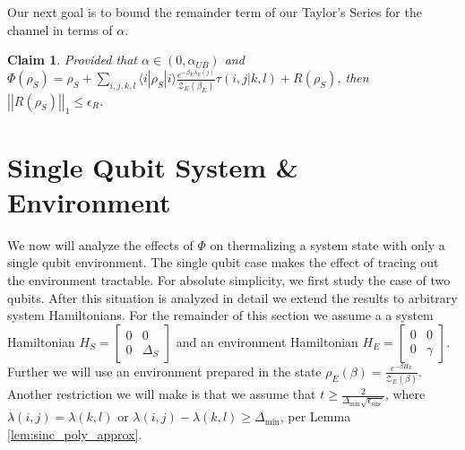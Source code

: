 \documentclass{article}
\newtheorem{claim}[theorem]{Claim}
\newcommand{\ket}[1]{|#1\rangle}
\newcommand{\bra}[1]{\langle #1|}
\newcommand{\norm}[1]{\left| \left| #1 \right| \right|}
\newcommand{\partfun}{\mathcal{Z}}
\DeclareMathOperator{\sinc}{sinc}
\begin{document}
Our next goal is to bound the remainder term of our Taylor's Series for the channel in terms of $\alpha$.
\begin{claim}
    Provided that $\alpha \in (0, \alpha_{UB})$ and $\Phi(\rho_S) = \rho_S +  \sum_{i,j,k,l} \bra{i} \rho_S \ket{i} \frac{e^{-\beta_E \lambda_E(j)}}{\partfun_E(\beta_E)} \tau(i,j |k,l) + R(\rho_S)$, then $\norm{R(\rho_S)}_1 \leq \epsilon_R$.
\end{claim}

\section{Single Qubit System \& Environment}
We now will analyze the effects of $\Phi$ on thermalizing a system state with only a single qubit environment. The single qubit case makes the effect of tracing out the environment tractable. For absolute simplicity, we first study the case of two qubits. After this situation is analyzed in detail we extend the results to arbitrary system Hamiltonians. For the remainder of this section we assume a a system Hamiltonian $H_S = \begin{bmatrix}
    0 & 0 \\ 0 & \Delta_S
\end{bmatrix}$ and an environment Hamiltonian $H_E = \begin{bmatrix}
    0 & 0 \\ 0 & \gamma
\end{bmatrix}$. Further we will use an environment prepared in the state $\rho_E(\beta) = \frac{e^{-\beta H_E}}{\partfun_E(\beta)}$. Another restriction we will make is that we assume that $t \geq \frac{2}{\Delta_{\min} \sqrt{\epsilon_{\sinc}}}$, where $\lambda(i,j) = \lambda(k,l)$ or $\lambda(i,j) - \lambda(k,l) \geq \Delta_{\min}$, per Lemma \ref{lem:sinc_poly_approx}. 
\end{document}
